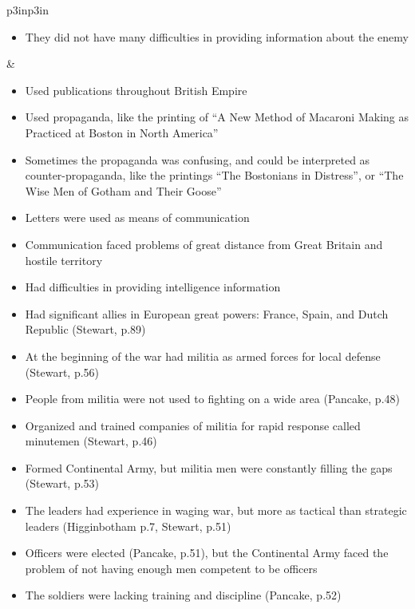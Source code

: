 \begin{singlespace}
\begin{mpxtabular}{p{3in}p{3in}}
\begin{itemize}[nolistsep,leftmargin=*]
	    \item  They did not have many difficulties in providing information
	      about the enemy \cite[63]{ladenburg_causes_1989}
	\end{itemize}
	&
	\begin{itemize}[nolistsep,leftmargin=*]
	    \item  Used publications throughout British Empire
	    \item  Used propaganda, like the printing of  “A New Method of
	      Macaroni Making as Practiced at Boston in North America”
	    \item  Sometimes the propaganda was confusing, and could be
	      interpreted as counter-propaganda, like the printings “The
	      Bostonians in Distress”, or “The Wise Men of Gotham and Their
	      Goose” \cite[168-169]{knollenberg_growth_2003}
	    \item  Letters were used as means of communication \cite[169]{knollenberg_growth_2003}
	    \item  Communication faced problems of great distance from Great Britain and hostile territory
	    \item  Had difficulties in providing intelligence information \cite[545]{mackesy1962british}
	\end{itemize}\ML
	\ML
	\begin{itemize}[nolistsep,leftmargin=*]
	    \item  Had significant allies in European great powers: France, Spain, and Dutch Republic (Stewart, p.89) 
	    \item  At the beginning of the war had militia as armed forces for local defense (Stewart, p.56) 
	    \item  People from militia were not used to fighting on a wide area (Pancake, p.48) 
	    \item  Organized and trained companies of militia for rapid response called minutemen (Stewart, p.46) 
	    \item  Formed Continental Army, but militia men were constantly filling the gaps (Stewart, p.53) 
	    \item  The leaders had experience in waging war, but more as tactical than strategic leaders (Higginbotham p.7, Stewart, p.51) 
	    \item  Officers were elected (Pancake, p.51), but the Continental Army faced the problem of not having enough men competent to be officers 
	    \item  The soldiers were lacking training and discipline (Pancake, p.52) 

\end{itemize}
\end{mpxtabular}
\end{singlespace}
